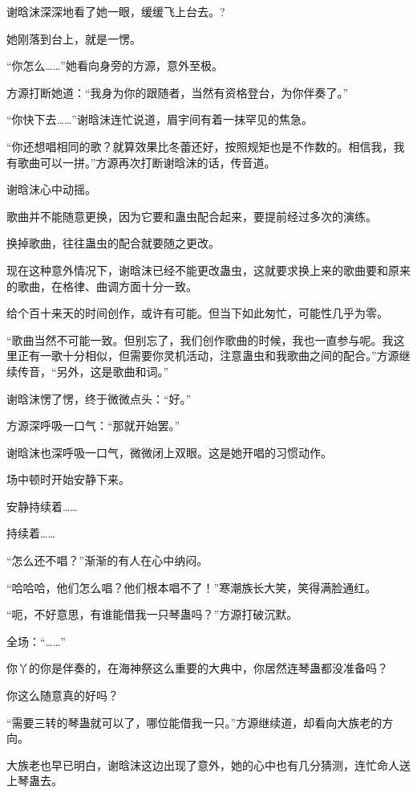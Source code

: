 
\begin{this_body}

谢晗沫深深地看了她一眼，缓缓飞上台去。?

她刚落到台上，就是一愣。

“你怎么……”她看向身旁的方源，意外至极。

方源打断她道：“我身为你的跟随者，当然有资格登台，为你伴奏了。”

“你快下去……”谢晗沫连忙说道，眉宇间有着一抹罕见的焦急。

“你还想唱相同的歌？就算效果比冬蕾还好，按照规矩也是不作数的。相信我，我有歌曲可以一拼。”方源再次打断谢晗沫的话，传音道。

谢晗沫心中动摇。

歌曲并不能随意更换，因为它要和蛊虫配合起来，要提前经过多次的演练。

换掉歌曲，往往蛊虫的配合就要随之更改。

现在这种意外情况下，谢晗沫已经不能更改蛊虫，这就要求换上来的歌曲要和原来的歌曲，在格律、曲调方面十分一致。

给个百十来天的时间创作，或许有可能。但当下如此匆忙，可能性几乎为零。

“歌曲当然不可能一致。但别忘了，我们创作歌曲的时候，我也一直参与呢。我这里正有一歌十分相似，但需要你灵机活动，注意蛊虫和我歌曲之间的配合。”方源继续传音，“另外，这是歌曲和词。”

谢晗沫愣了愣，终于微微点头：“好。”

方源深呼吸一口气：“那就开始罢。”

谢晗沫也深呼吸一口气，微微闭上双眼。这是她开唱的习惯动作。

场中顿时开始安静下来。

安静持续着……

持续着……

“怎么还不唱？”渐渐的有人在心中纳闷。

“哈哈哈，他们怎么唱？他们根本唱不了！”寒潮族长大笑，笑得满脸通红。

“呃，不好意思，有谁能借我一只琴蛊吗？”方源打破沉默。

全场：“……”

你丫的你是伴奏的，在海神祭这么重要的大典中，你居然连琴蛊都没准备吗？

你这么随意真的好吗？

“需要三转的琴蛊就可以了，哪位能借我一只。”方源继续道，却看向大族老的方向。

大族老也早已明白，谢晗沫这边出现了意外，她的心中也有几分猜测，连忙命人送上琴蛊去。


\end{this_body}
